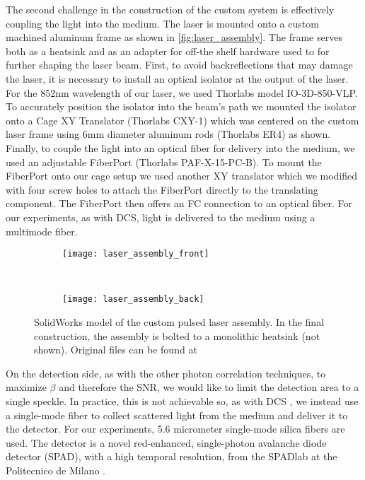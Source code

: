 The second challenge in the construction of the custom system is effectively coupling the light into the medium. The laser is mounted onto a custom machined aluminum frame as shown in \autoref{fig:laser_assembly}. The frame serves both as a heatsink and as an adapter for off-the shelf hardware used to for further shaping the laser beam. First, to avoid backreflections that may damage the laser, it is necessary to install an optical isolator at the output of the laser. For the 852nm wavelength of our laser, we used Thorlabs model IO-3D-850-VLP. To accurately position the isolator into the beam's path we mounted the isolator onto a Cage XY Translator (Thorlabs CXY-1) which was centered on the custom laser frame using 6mm diameter aluminum rods (Thorlabs ER4) as shown. Finally, to couple the light into an optical fiber for delivery into the medium, we used an adjustable FiberPort (Thorlabs PAF-X-15-PC-B). To mount the FiberPort onto our cage setup we used another XY translator which we modified with four screw holes to attach the FiberPort directly to the translating component. The FiberPort then offers an FC connection to an optical fiber. For our experiments, as with DCS, light is delivered to the medium using a multimode fiber. %

\begin{figure}[tb]
    \begin{subfigure}{0.49\textwidth}
        \centering
        \texttt{[image: laser\_assembly\_front]}
    \end{subfigure}~%
    \begin{subfigure}{0.49\textwidth}
        \centering
        \texttt{[image: laser\_assembly\_back]}
    \end{subfigure}
    \caption{SolidWorks model of the custom pulsed laser assembly. In the final construction, the assembly is bolted to a monolithic heatsink (not shown). Original files can be found at \coderepolink}
    \label{fig:laser_assembly}
\end{figure}

On the detection side, as with the other photon correlation techniques, to maximize $\beta$ and therefore the SNR, we would like to limit the detection area to a single speckle. In practice, this is not achievable so, as with DCS \cite[Section 6.2]{Boas1996thesis}, we instead use a single-mode fiber to collect scattered light from the medium and deliver it to the detector. For our experiments, 5.6 micrometer single-mode silica fibers are used. The detector is a novel red-enhanced, single-photon avalanche diode detector (SPAD), with a high temporal resolution, from the SPADlab at the Politecnico de Milano \cite{Gulinatti2012,Giudice2012}. 


